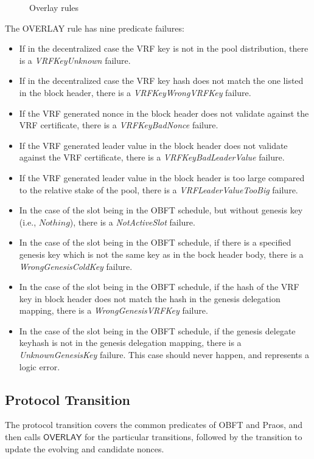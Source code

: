 \begin{figure}[ht]
  \caption{Overlay rules}
  \label{fig:rules:overlay}
\end{figure}

The OVERLAY rule has nine predicate failures:
\begin{itemize}
\item If in the decentralized case the VRF key is not in the pool distribution,
  there is a \emph{VRFKeyUnknown} failure.
\item If in the decentralized case the VRF key hash does not match the one
  listed in the block header, there is a \emph{VRFKeyWrongVRFKey} failure.
\item If the VRF generated nonce in the block header does not validate
  against the VRF certificate, there is a \emph{VRFKeyBadNonce} failure.
\item If the VRF generated leader value in the block header does not validate
  against the VRF certificate, there is a \emph{VRFKeyBadLeaderValue} failure.
\item If the VRF generated leader value in the block header is too large
  compared to the relative stake of the pool, there is a \emph{VRFLeaderValueTooBig} failure.
\item In the case of the slot being in the OBFT schedule, but without genesis
  key (i.e., $Nothing$), there is a \emph{NotActiveSlot} failure.
\item In the case of the slot being in the OBFT schedule, if there is a
  specified genesis key which is not the same key as in the bock header body,
  there is a \emph{WrongGenesisColdKey} failure.
\item In the case of the slot being in the OBFT schedule, if the hash of the
  VRF key in block header does not match the hash in the genesis delegation mapping,
  there is a \emph{WrongGenesisVRFKey} failure.
\item In the case of the slot being in the OBFT schedule, if the genesis delegate
  keyhash is not in the genesis delegation mapping,
  there is a \emph{UnknownGenesisKey} failure.
  This case should never happen, and represents a logic error.

\end{itemize}

\clearpage

\subsection{Protocol Transition}
\label{sec:protocol-trans}

The protocol transition covers the common predicates of OBFT and Praos,
and then calls $\mathsf{OVERLAY}$ for the particular transitions,
followed by the transition to update the evolving and candidate nonces.

